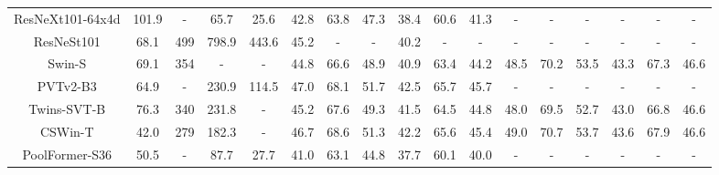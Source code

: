 \documentclass[10pt,twocolumn,letterpaper]{article}
\begin{document}
\begin{table*}[]
{\begin{tabular}{c|cc|cc|cccccc|cccccc}
    \midrule
    ResNeXt101-64x4d\cite{ResNeXt}      & 101.9      & -    &65.7   & 25.6     & 42.8 & 63.8 &47.3 &38.4 &60.6 &41.3          & -          & -          & -          & -          & -          & -          \\
    ResNeSt101\cite{zhang2022resnest}      & 68.1      & 499   &798.9   &443.6      & 45.2          & -          & -          & 40.2          & -          & -          & -          & -          & -          & -          & -          & -          \\
    Swin-S\cite{Swin}         & 69.1      & 354    & -   & -     & 44.8          & 66.6          & 48.9          & 40.9          & 63.4          & 44.2          & 48.5          & 70.2          & 53.5          & 43.3          & 67.3          & 46.6          \\
    PVTv2-B3\cite{PVT_v2}            & 64.9      & -    &230.9   &   114.5   & 47.0 &68.1 &51.7 &42.5 &65.7 &45.7          & -          & -          & -          & -          & -          & -          \\
    Twins-SVT-B\cite{Twins}    & 76.3      & 340   & 231.8  &   -   & 45.2          & 67.6          & 49.3          & 41.5          & 64.5          & 44.8          & 48.0          & 69.5          & 52.7          & 43.0          & 66.8          & 46.6          \\
    CSWin-T\cite{CSWin}          & 42.0      & 279   & 182.3  &  -    & 46.7          & 68.6          & 51.3          & 42.2          & 65.6          & 45.4          & 49.0          & 70.7          & 53.7          & 43.6          & 67.9          & 46.6          \\
    PoolFormer-S36\cite{metaformer}       & 50.5   & -    &87.7   & 27.7  &41.0   &63.1   &44.8   &37.7   &60.1   &40.0   &-  & -   &-    & -     &-     & -     \\
    

\end{tabular}}
\end{table*}
\end{document}
